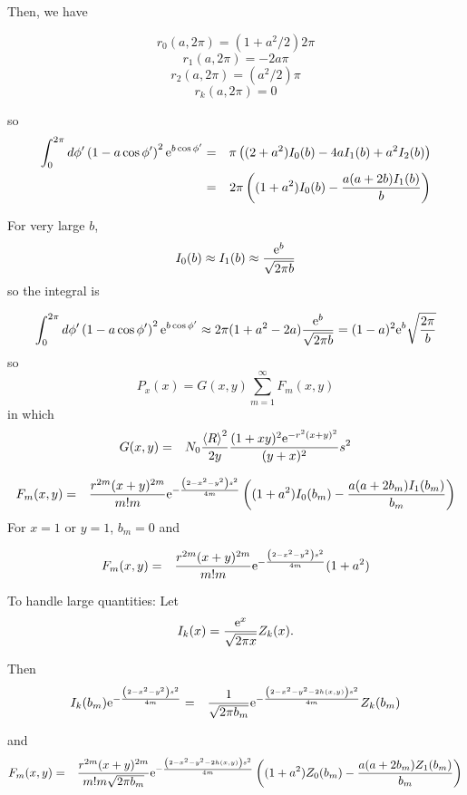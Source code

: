 \documentclass[11pt]{article}
\newcommand{\e}{{\rm e}}
\begin{document}
{{{{Then, we have

$$r_{0}(a,2\pi)=(1+a^{2}/2)2\pi$$
$$r_{1}(a,2\pi)=-2a\pi$$
$$r_{2}(a,2\pi)=(a^{2}/2)\pi$$
$$r_{k}(a,2\pi)=0$$

so
\begin{eqnarray}
\int_{0}^{2\pi}d\phi'\left(1-a\cos\phi' \right)^{2}\e^{b\cos\phi'}&=&
\pi\left((2+a^{2})I_{0}(b)-4aI_{1}(b)+a^{2}I_{2}(b)\right)\\
&=&
2\pi\left((1+a^{2})I_{0}(b)-\frac{a(a+2b)I_{1}(b)}{b}\right)
\end{eqnarray}

For very large $b$,
$$I_{0}(b)\approx I_{1}(b)\approx\frac{\e^{b}}{\sqrt{2\pi b}}$$ so the integral is

$$\int_{0}^{2\pi}d\phi'\left(1-a\cos\phi' \right)^{2}\e^{b\cos\phi'}\approx 2\pi(1+a^{2}-2a)\frac{\e^{b}}{\sqrt{2\pi b}}=(1-a)^{2}\e^{b}\sqrt{\frac{2\pi}{ b}}$$
so
$$P_{x}(x)=G(x,y)\sum_{m=1}^{\infty}F_{m}(x,y)$$
in which
\begin{eqnarray}
G(x,y)&=&N_{0}\frac{\left<R\right>^{2}}{2y}\frac{(1+xy)^{2}\e^{-r^{2}(x+y)^{2}}}{(y+x)^{2}}
s^{2}
\end{eqnarray}

\begin{eqnarray}
F_{m}(x,y)&=&\frac{r^{2m}(x+y)^{2m}}{m!m}\e^{-\frac{\left(2-x^{2}-y^{2}\right)s^{2}}{4m}}\left((1+a^{2})I_{0}(b_{m})-\frac{a(a+2b_{m})I_{1}(b_{m})}{b_{m}}\right)
\end{eqnarray}
For $x=1$ or $y=1$, $b_{m}=0$ and

\begin{eqnarray}
F_{m}(x,y)&=&\frac{r^{2m}(x+y)^{2m}}{m!m}\e^{-\frac{\left(2-x^{2}-y^{2}\right)s^{2}}{4m}}(1+a^{2})
\end{eqnarray}


To handle large quantities:
Let $$I_{k}(x)=\frac{\e^{x}}{\sqrt{2\pi x}}Z_{k}(x).$$

Then
\begin{eqnarray}
I_{k}(b_{m})\e^{-\frac{\left(2-x^{2}-y^{2}\right)s^{2}}{4m}}&=&\frac{1}{\sqrt{2\pi b_{m}}}\e^{-\frac{\left(2-x^{2}-y^{2}-2h(x,y)\right)s^{2}}{4m}}Z_{k}(b_{m})
\end{eqnarray}

and
\begin{eqnarray}
F_{m}(x,y)&=&\frac{r^{2m}(x+y)^{2m}}{m!m\sqrt{2\pi b_{m}}}\e^{-\frac{\left(2-x^{2}-y^{2}-2h(x,y)\right)s^{2}}{4m}}\left((1+a^{2})Z_{0}(b_{m})-\frac{a(a+2b_{m})Z_{1}(b_{m})}{b_{m}}\right)
\end{eqnarray}

}}}}
\end{document}
